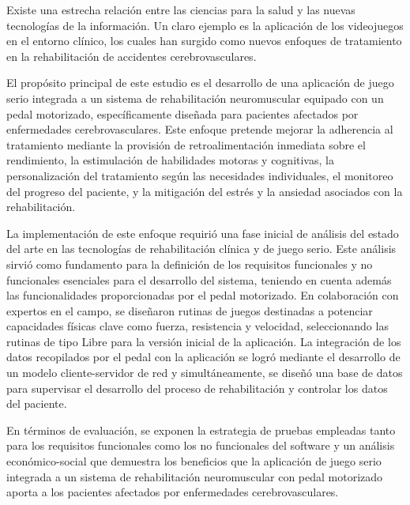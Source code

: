 \begin{resumen}
Existe una estrecha relación entre las ciencias para la salud y las nuevas tecnologías de la información. Un claro ejemplo es la aplicación de los videojuegos en el entorno clínico, los cuales han surgido como nuevos enfoques de tratamiento en la rehabilitación de accidentes cerebrovasculares. 

El propósito principal de este estudio es el desarrollo de una aplicación de juego serio integrada a un sistema de rehabilitación neuromuscular equipado con un pedal motorizado, específicamente diseñada para pacientes afectados por enfermedades cerebrovasculares. Este enfoque pretende mejorar la adherencia al tratamiento mediante la provisión de retroalimentación inmediata sobre el rendimiento, la estimulación de habilidades motoras y cognitivas, la personalización del tratamiento según las necesidades individuales, el monitoreo del progreso del paciente, y la mitigación del estrés y la ansiedad asociados con la rehabilitación.

La implementación de este enfoque requirió una fase inicial de análisis del estado del arte en las tecnologías de rehabilitación clínica y de juego serio. Este análisis sirvió como fundamento para la definición de los requisitos funcionales y no funcionales esenciales para el desarrollo del sistema, teniendo en cuenta además las funcionalidades proporcionadas por el pedal motorizado. En colaboración con expertos en el campo, se diseñaron rutinas de juegos destinadas a potenciar capacidades físicas clave como fuerza, resistencia y velocidad, seleccionando las rutinas de tipo Libre para la versión inicial de la aplicación. La integración de los datos recopilados por el pedal con la aplicación se logró mediante el desarrollo de un modelo cliente-servidor de red y simultáneamente, se diseñó una base de datos para supervisar el desarrollo del proceso de rehabilitación y controlar los datos del paciente.

En términos de evaluación, se exponen la estrategia de pruebas empleadas tanto para los requisitos funcionales como los no funcionales del software y un análisis económico-social que demuestra los beneficios que la aplicación de juego serio integrada a un sistema de rehabilitación neuromuscular con pedal motorizado aporta a los pacientes afectados por enfermedades cerebrovasculares.
\end{resumen}
